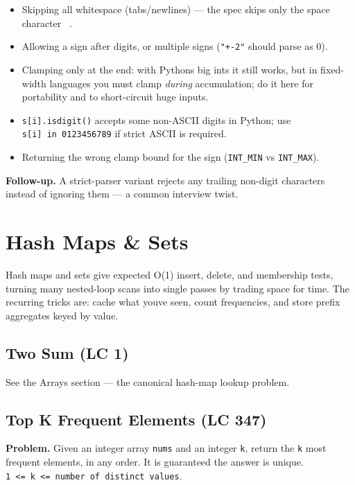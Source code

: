 \documentclass[11pt]{article}
\providecommand{\tightlist}{\setlength{\itemsep}{1pt}\setlength{\parskip}{0pt}}
\begin{document}
\begin{itemize}
\tightlist
\item
  Skipping all whitespace (tabs/newlines) --- the spec skips only the space character \texttt{\textquotesingle{}\ \textquotesingle{}}.
\item
  Allowing a sign after digits, or multiple signs (\texttt{"+-2"} should parse as 0).
\item
  Clamping only at the end: with Python\textquotesingle s big ints it still works, but in fixed-width languages you must clamp \emph{during} accumulation; do it here for portability and to short-circuit huge inputs.
\item
  \texttt{s{[}i{]}.isdigit()} accepts some non-ASCII digits in Python; use \texttt{s{[}i{]}\ in\ \textquotesingle{}0123456789\textquotesingle{}} if strict ASCII is required.
\item
  Returning the wrong clamp bound for the sign (\texttt{INT\_MIN} vs \texttt{INT\_MAX}).
\end{itemize}

\textbf{Follow-up.} A strict-parser variant rejects any trailing non-digit characters instead of ignoring them --- a common interview twist.

\section{Hash Maps \& Sets}\label{hash-maps--sets}

Hash maps and sets give expected O(1) insert, delete, and membership tests, turning many nested-loop scans into single passes by trading space for time. The recurring tricks are: cache what you\textquotesingle ve seen, count frequencies, and store prefix aggregates keyed by value.

\subsection{Two Sum (LC 1)}\label{two-sum-lc-1-1}

See the Arrays section --- the canonical hash-map lookup problem.

\subsection{Top K Frequent Elements (LC 347)}\label{top-k-frequent-elements-lc-347}

\textbf{Problem.} Given an integer array \texttt{nums} and an integer \texttt{k}, return the \texttt{k} most frequent elements, in any order. It is guaranteed the answer is unique. \texttt{1\ \textless{}=\ k\ \textless{}=\ number\ of\ distinct\ values}.
\end{document}
